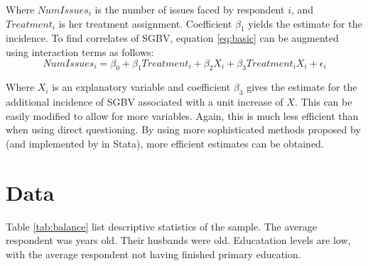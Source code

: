 \documentclass[10pt,a4paper]{scrartcl} %
\newcommand{\tableloc}{C:/Users/Koen/Dropbox/PhD/Papers/CongoGBV/Tables}
\begin{document}
Where \(NumIssues_i\) is the number of issues faced by respondent $i$, and \(Treatment_i\) is her treatment assignment. Coefficient \(\beta_1\) yields the estimate for the incidence. To find correlates of SGBV, equation \ref{eq:basic} can be augmented using interaction terms as follows: 
\begin{equation}
\label{eq:interaction}
NumIssues_i = \beta_0 + \beta_1 Treatment_i + \beta_2 X_i + \beta_3 Treatment_i X_i + \epsilon_i
\end{equation}

Where \(X_i\) is an explanatory variable and coefficient \(\beta_3\) gives the estimate for the additional incidence of SGBV associated with a unit increase of \(X\). This can be easily modified to allow for more variables. Again, this is much less efficient than when using direct questioning. By using more sophisticated methods proposed by \citet{Imai2011} (and implemented by \cite{Tsai2019} in Stata), more efficient estimates can be obtained. 





\section*{Data}
Table \ref{tab:balance} list descriptive statistics of the sample. The average respondent was  years old. Their husbands were  old. Educatation levels are low, with the average respondent not having finished primary education.
\end{document}
